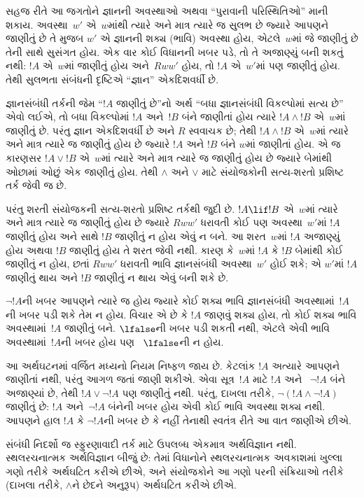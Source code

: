 સહજ રીતે આ જગતોને જ્ઞાનની અવસ્થાઓ અથવા ``પુરાવાની
પરિસ્થિતિઓ'' માની શકાય. અવસ્થા~$w'$ એ~$w$માંથી ત્યારે અને
માત્ર ત્યારે જ સુલભ છે જ્યારે આપણને જાણીતું છે તે મુજબ
$w'$ એ જ્ઞાનની શક્ય (ભાવિ) અવસ્થા હોય, એટલે~$w$માં
જે જાણીતું છે તેની સાથે સુસંગત હોય. એક વાર કોઈ વિધાનની
ખબર પડે, તો તે અજાણ્યું બની શકતું નથી: $!A$ એ~$w$માં
જાણીતું હોય અને~$Rww'$ હોય, તો $!A$ એ~$w'$માં પણ
જાણીતું હોય. તેથી સુલભતા સંબંધની દૃષ્ટિએ ``જ્ઞાન''
એકદિશવર્ધી છે.

જ્ઞાનસંબંધી તર્કની જેમ ``$!A$ જાણીતું છે''નો અર્થ
``બધા જ્ઞાનસંબંધી વિકલ્પોમાં સત્ય છે'' એવો લઈએ, તો
બધા વિકલ્પોમાં $!A$ અને~$!B$ બંને જાણીતાં હોય ત્યારે
$!A \land !B$ એ~$w$માં જાણીતું છે. પરંતુ જ્ઞાન
એકદિશવર્ધી છે અને $R$ સ્વવાચક છે; તેથી $!A \land !B$
એ~$w$માં ત્યારે અને માત્ર ત્યારે જ જાણીતું હોય છે જ્યારે
$!A$ અને $!B$ બંને $w$માં જાણીતાં હોય. એ જ કારણસર
$!A \lor !B$ એ~$w$માં ત્યારે અને માત્ર ત્યારે જ
જાણીતું હોય છે જ્યારે બેમાંથી ઓછામાં ઓછું એક જાણીતું હોય.
તેથી $\land$ અને $\lor$ માટે સંયોજકોની સત્ય-શરતો
પ્રશિષ્ટ તર્ક જેવી જ છે.

પરંતુ શરતી સંયોજકની સત્ય-શરતો પ્રશિષ્ટ તર્કથી જુદી છે.
$!A \lif !B$ એ~$w$માં ત્યારે અને માત્ર ત્યારે જ જાણીતું
હોય છે જ્યારે $Rww'$ ધરાવતી કોઈ પણ અવસ્થા~$w'$માં $!A$
જાણીતું હોય અને સાથે $!B$ જાણીતું ન હોય એવું ન બને.
આ શરત~$w$માં $!A$ અજાણ્યું હોય અથવા $!B$ જાણીતું
હોય તે શરત જેવી નથી. કારણ કે~$w$માં $!A$ કે $!B$
બેમાંથી કોઈ જાણીતું ન હોય, છતાં $Rww'$ ધરાવતી ભાવિ
જ્ઞાનસંબંધી અવસ્થા~$w'$ હોઈ શકે; એ $w'$માં $!A$
જાણીતું થાય અને $!B$ જાણીતું ન થાય એવું બની શકે છે.

$\lnot !A$ની ખબર આપણને ત્યારે જ હોય જ્યારે કોઈ શક્ય
ભાવિ જ્ઞાનસંબંધી અવસ્થામાં~$!A$ની ખબર પડી શકે તેમ ન હોય.
વિચાર એ છે કે $!A$ જાણવું શક્ય હોય, તો કોઈ શક્ય ભાવિ
અવસ્થામાં~$!A$ જાણીતું બને. $\lfalse$ની ખબર પડી શકતી
નથી, એટલે એવી ભાવિ અવસ્થામાં~$!A$ની ખબર હોય પણ
~$\lfalse$ની ન હોય.

આ અર્થઘટનમાં વર્જિત મધ્યનો નિયમ નિષ્ફળ જાય છે. કેટલાંક
$!A$ અત્યારે આપણને જાણીતાં નથી, પરંતુ આગળ જતાં જાણી
શકીએ. એવા સૂત્ર~$!A$ માટે $!A$ અને
~$\lnot !A$ બંને અજાણ્યાં છે, તેથી $!A \lor \lnot !A$
પણ જાણીતું નથી. પરંતુ, દાખલા તરીકે, $\lnot(!A \land
\lnot !A)$ જાણીતું છે: $!A$ અને~$\lnot !A$ બંનેની
ખબર હોય એવી કોઈ ભાવિ અવસ્થા શક્ય નથી. આપણને હાલ $!A$
કે $\lnot !A$ની ખબર છે કે નહીં તેનાથી સ્વતંત્ર રીતે આ
વાત જાણીએ છીએ.

સંબંધી નિદર્શો જ સ્ફુરણાવાદી તર્ક માટે ઉપલબ્ધ
એકમાત્ર અર્થવિજ્ઞાન નથી. સ્થલરચનાત્મક અર્થવિજ્ઞાન બીજું
છે: તેમાં વિધાનોને સ્થલરચનાત્મક અવકાશમાં ખુલ્લા ગણો
તરીકે અર્થઘટિત કરીએ છીએ, અને સંયોજકોને આ ગણો પરની
સંક્રિયાઓ તરીકે (દાખલા તરીકે, $\land$ને છેદને અનુરૂપ)
અર્થઘટિત કરીએ છીએ.
\endgroup

